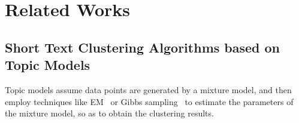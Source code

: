 \section{Related Works} \label{related_works}

\subsection{Short Text Clustering Algorithms based on Topic Models}
Topic models assume data points are generated by a mixture model, and then employ techniques like EM~\cite{bishop2006pattern} or Gibbs sampling~\cite{robert2004monte} to estimate the parameters of the mixture model, so as to obtain the clustering results.

